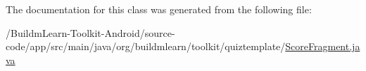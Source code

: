 The documentation for this class was generated from the following file\-:\begin{DoxyCompactItemize}
\item 
/\-Buildm\-Learn-\/\-Toolkit-\/\-Android/source-\/code/app/src/main/java/org/buildmlearn/toolkit/quiztemplate/\hyperlink{quiztemplate_2ScoreFragment_8java}{Score\-Fragment.\-java}\end{DoxyCompactItemize}
